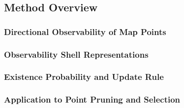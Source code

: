 \subsection{Method Overview}

\subsubsection{Directional Observability of Map Points}

\subsubsection{Observability Shell Representations}

\subsubsection{Existence Probability and Update Rule}

\subsubsection{Application to Point Pruning and Selection}
